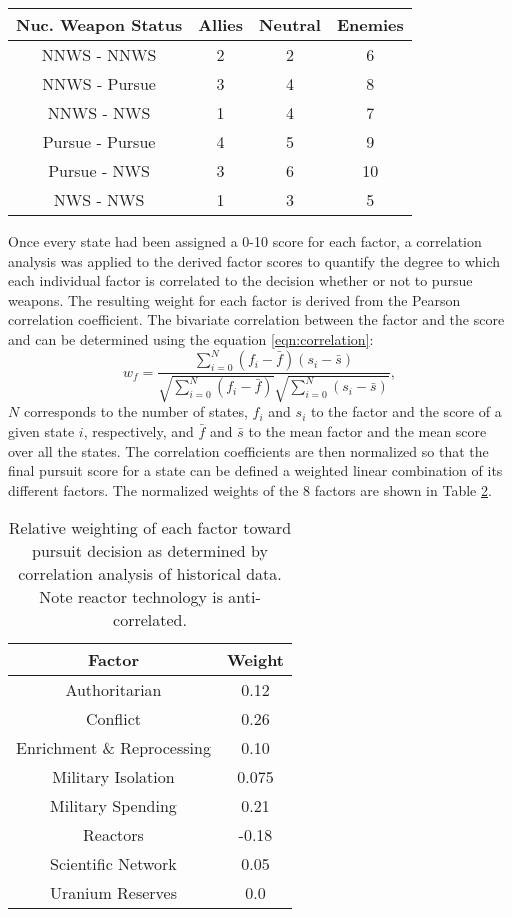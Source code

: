 \begin{table}
\centering
\begin{tabular}{||c|c|c|c|}
\hline
\textbf{Nuc. Weapon Status} & \textbf{Allies}  & \textbf{Neutral}  & \textbf{Enemies} \\
\hline
\hline
NNWS - NNWS     & 2 & 2 & 6 \\
\hline
NNWS - Pursue   & 3 & 4 & 8 \\
\hline
NNWS - NWS      & 1 & 4 & 7 \\
\hline
Pursue - Pursue & 4 & 5 & 9 \\
\hline
Pursue - NWS    & 3 & 6 & 10 \\
\hline
NWS - NWS       & 1 & 3 & 5 \\
\hline
\end{tabular}
\caption{}
\label{tab:conflict}
\end{table}

Once every state had been assigned a 0-10 score for each factor, a correlation
analysis was applied to the derived factor scores to quantify the degree to
which each individual factor is correlated to the decision whether or not to
pursue weapons. The resulting weight for each factor is derived from the Pearson correlation coefficient. The bivariate correlation between the factor and the score and can be determined using the equation \ref{eqn:correlation}:
\begin{equation}
    \label{eqn:correlation}
    w_{f} = \frac{\sum_{i=0}^{N} (f_{i} - \bar{f}) (s_{i} - \bar{s})}
                 {\sqrt{\sum_{i=0}^{N}\left(f_{i} - \bar{f}\right)}
                 \sqrt{\sum_{i=0}^{N}\left(s_{i} - \bar{s}\right)}},
\end{equation}
$N$ corresponds to the number of states, $f_{i}$ and $s_{i}$ to the factor and the score of a given state $i$, respectively,  and $\bar{f}$ and $\bar{s}$ to
the mean factor and the mean score over all the states.  The correlation coefficients are then normalized so that the final pursuit score for a state can be defined a weighted linear combination of its different factors. The normalized weights of the 8 factors are shown in Table \ref{tab:factor_weights}. 

\begin{table}
\centering
\begin{tabular}{|c|c|}
\hline
\textbf{Factor}        & \textbf{Weight} \\
\hline
Authoritarian   & 0.12 \\
Conflict  & 0.26 \\
Enrichment \& Reprocessing & 0.10 \\
Military Isolation & 0.075 \\
Military Spending & 0.21 \\
Reactors           & -0.18 \\
Scientific Network & 0.05 \\
Uranium Reserves &  0.0 \\
\hline
\end{tabular}
\caption{Relative weighting of each factor toward pursuit decision as determined by correlation analysis of historical data. Note reactor technology is anti-correlated.}
\label{tab:factor_weights}
\end{table}

